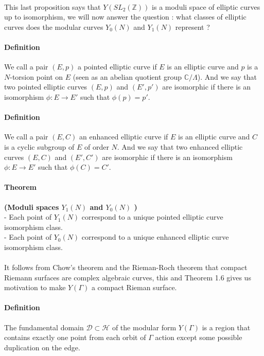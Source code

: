 \documentclass[letterpaper,10pt]{article}
\begin{document}
{\itshape \paragraph{} This last proposition says that $Y(SL_2(\mathbb{Z}))$ is a moduli space of elliptic curves up to isomorphism, we will now answer the question :
what classes of elliptic curves does the modular curves $Y_0(N)$ and $Y_1(N)$ represent ?  } 

\paragraph{Definition } We call a pair $(E,p)$ a pointed elliptic curve if $E$ is an elliptic curve and $p$ is a $N$-torsion point on $E$ 
(seen as an abelian quotient group $\mathbb{C}/ \Lambda$). And we say that two pointed elliptic curves $(E,p)$ and $(E',p')$ are isomorphic if there is an isomorphism
$\phi: E\to E'$ such that $\phi(p) = p'$.

\paragraph{Definition } We call a pair $(E,C)$ an enhanced elliptic curve if $E$ is an elliptic curve and $C$ is a cyclic subgroup of $E$ of order $N$. 
And we say that two enhanced elliptic curves $(E,C)$ and $(E',C')$ are isomorphic if there is an isomorphism
$\phi: E\to E'$ such that $\phi(C) = C'$.

\paragraph{Theorem }\textbf{(Moduli spaces $Y_1(N)$ and $Y_0(N)$ )} \\- Each point of $Y_1(N)$ correspond to a unique pointed elliptic curve isomorphism class.\\
 - Each point of $Y_0(N)$ correspond to a unique enhanced elliptic curve isomorphism class.

 {\itshape \paragraph{} It follows from Chow's theorem and the Rieman-Roch theorem that compact Riemann surfaces are complex algebraic curves,
  this and Theorem 1.6 gives us motivation to make $Y(\Gamma) $ a compact Rieman surface. }


\paragraph{Definition } The fundamental domain $\mathcal{D} \subset \mathcal{H}$ of the modular form $Y(\Gamma)$ is
a region that contains exactly one point from each orbit of $\Gamma$ action except some
possible duplication on the edge.
\end{document}

